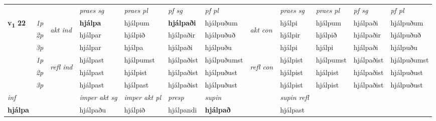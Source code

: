 \begin{longtable}[l]{X>{\footnotesize\itshape}llXXXXlXXXX}
\midrule

 & &   & \textit{praes sg}  & \textit{praes pl}    & \textit{ pf sg} & \textit{pf pl} & & \textit{praes sg}  & \textit{praes pl}    & \textit{pf sg} & \textit{pf pl }  \\ \cmidrule{4-7} \cmidrule{9-12}
 \multirow{2}{*}{{{\textbf{v{\textsubscript{1}}} \Large{\textbf{22}}}}}  & 1p & \multirow{3}{*}{\begin{turn}{90}\textit{akt ind}\end{turn}} & \textbf{hjálpa} & hjálpum & \textbf{hjálpaði} & hjálpuðum & \multirow{3}{*}{\begin{turn}{90}\textit{akt con}\end{turn}} &hjálpi & hjálpum & hjálpaði & hjálpuðum\\*
 & 2p &  &  hjálpar  & hjálpið & hjálpaðir & hjálpuðuð & & hjálpir & hjálpið & hjálpaðir & hjálpuðuð \\*
 & 3p &  & hjálpar & hjálpa & hjálpaði & hjálpuðu & & hjálpi & hjálpi& hjálpaði & hjálpuðu \\*
\cmidrule{4-7} \cmidrule{9-12}
 & 1p & \multirow{3}{*}{\begin{turn}{90}\textit{refl ind}\end{turn}}  & hjálpast & hjálpumst & hjálpaðist & hjálpuðumst & \multirow{3}{*}{\begin{turn}{90}\textit{refl con}\end{turn}}  &hjálpist & hjálpumst & hjálpaðist & hjálpuðumst \\*
 & 2p &  & hjálpast & hjálpist & hjálpaðist & hjálpuðust & &hjálpist & hjálpist & hjálpaðist & hjálpuðust \\*
 & 3p  & & hjálpast & hjálpast & hjálpaðist & hjálpuðust & & hjálpist & hjálpist& hjálpaðist & hjálpuðust \\*
\cmidrule{4-7} \cmidrule{9-12}

   {\textit{inf}} & &  & \textit{imper akt sg} & \textit{imper akt pl}   & \textit{presp} & \textit{supin} && \textit{supin refl}  \\*
  {\textbf{hjálpa}} & && hjálpaðu  & hjálpið   & hjálpandi &  \textbf{hjálpað} && hjálpast  \\*

\midrule


\end{longtable}
